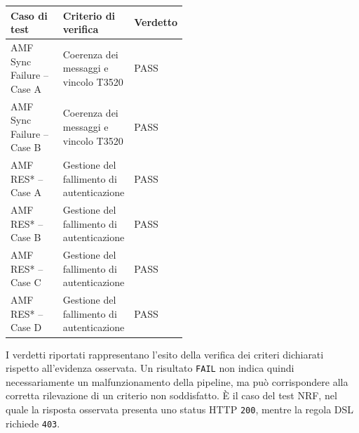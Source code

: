 \begin{center}
\begin{minipage}{\textwidth}
\centering

\begingroup
\small
\setlength{\tabcolsep}{5pt}
\renewcommand{\arraystretch}{1.3}

\begin{tabularx}{\linewidth}{|
    >{\raggedright\arraybackslash}p{0.31\linewidth}|
    >{\raggedright\arraybackslash}X|
    >{\centering\arraybackslash}p{0.19\linewidth}|}
\hline

\rowcolor{blue!7}
\textbf{Caso di test} &
\textbf{Criterio di verifica} &
\textbf{Verdetto} \\
\hline

AMF Sync Failure -- Case A &
Coerenza dei messaggi e vincolo T3520 &
PASS \\
\hline

AMF Sync Failure -- Case B &
Coerenza dei messaggi e vincolo T3520 &
PASS \\
\hline

AMF RES* -- Case A &
Gestione del fallimento di autenticazione &
PASS \\
\hline

AMF RES* -- Case B &
Gestione del fallimento di autenticazione &
PASS \\
\hline

AMF RES* -- Case C &
Gestione del fallimento di autenticazione &
PASS \\
\hline

AMF RES* -- Case D &
Gestione del fallimento di autenticazione &
PASS \\
\hline

\end{tabularx}
\endgroup

\label{tab:free5gc_results}

\end{minipage}
\end{center}





I verdetti riportati rappresentano l'esito della verifica dei criteri dichiarati rispetto all'evidenza osservata. Un risultato \texttt{FAIL} non indica quindi necessariamente un malfunzionamento della pipeline, ma può corrispondere alla corretta rilevazione di un criterio non soddisfatto. È il caso del test NRF, nel quale la risposta osservata presenta uno status HTTP \texttt{200}, mentre la regola DSL richiede \texttt{403}.

